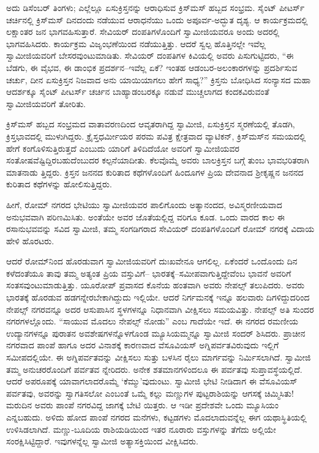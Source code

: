 ಅದು ಡಿಸೆಂಬರ್ ತಿಂಗಳು; ಎಲ್ಲೆಲ್ಲೂ ಏಸುಕ್ರಿಸ್ತನನ್ನು ಆರಾಧಿಸುವ ಕ್ರಿಸ್​ಮಸ್ ಹಬ್ಬದ ಸಂಭ್ರಮ. ಸೈಂಟ್ ಪೀಟರ್ಸ್ ಚರ್ಚಿನಲ್ಲಿ ಕ್ರಿಸ್​ಮಸ್ ದಿನದಂದು ನಡೆಯುವ ಆರಾಧನೆಯು ಒಂದು ಅಪೂರ್ವ-ಅದ್ಭುತ ದೃಶ್ಯ. ಆ ಕಾರ್ಯಕ್ರಮದಲ್ಲಿ ಲಕ್ಷಾಂತರ ಜನ ಭಾಗವಹಿಸುತ್ತಾರೆ. ಸೇವಿಯರ್ ದಂಪತಿಗಳೊಂದಿಗೆ ಸ್ವಾಮೀಜಿಯವರೂ ಅಂದು ಅದರಲ್ಲಿ ಭಾಗವಹಿಸಿದರು. ಕಾರ್ಯಕ್ರಮ ವಿಜೃಂಭಣೆಯಿಂದ ನಡೆಯುತ್ತಿತ್ತು. ಆದರೆ ಸ್ವಲ್ಪ ಹೊತ್ತಿನಲ್ಲೇ ಇವೆಲ್ಲ ಸ್ವಾಮೀಜಿಯವರಿಗೆ ಬೇಸರವುಂಟುಮಾಡಿತು. ಸೇವಿಯರ್ ದಂಪತಿಗಳ ಕಿವಿಯಲ್ಲಿ ಅವರು ಪಿಸುಗುಟ್ಟಿದರು, “ಈ ಬೆಡಗು, ಈ ವೈಭವ, ಈ ಡಾಂಭಿಕ ಪ್ರದರ್ಶನ–ಇವೆಲ್ಲ ಏಕೆ? ಇಂತಹ ಆಡಂಬರ-ಅಲಂಕಾರಗಳನ್ನು ಪ್ರದರ್ಶಿಸುವ ಚರ್ಚು, ದೀನ ಏಸುಕ್ರಿಸ್ತನ ನಿಜವಾದ ಅನು ಯಾಯಿಯಾಗಲು ಹೇಗೆ ಸಾಧ್ಯ?” ಕ್ರಿಸ್ತನು ಬೋಧಿಸಿದ ಸಂನ್ಯಾಸದ ಮಹಾ ಆದರ್ಶಕ್ಕೂ ಸೈಂಟ್ ಪೀಟರ್ಸ್ ಚರ್ಚಿನ ಬಾಹ್ಯಾಡಂಬರಕ್ಕೂ ನಡುವೆ ಮುಚ್ಚಲಾಗದ ಕಂದಕವಿರುವಂತೆ ಸ್ವಾಮೀಜಿಯವರಿಗೆ ತೋರಿತು.

ಕ್ರಿಸ್​ಮಸ್ ಹಬ್ಬದ ಸಂಭ್ರಮದ ವಾತಾವರಣದಿಂದ ಆವೃತರಾಗಿದ್ದ ಸ್ವಾಮೀಜಿ, ಏಸುಕ್ರಿಸ್ತನ ಸ್ಮರಣೆಯಲ್ಲಿ ತೊಡಗಿ, ಕ್ರಿಸ್ತಭಾವದಲ್ಲಿ ಮುಳುಗಿದ್ದರು. ಕ್ರೈಸ್ತಧರ್ಮೀಯರ ಪರಮ ಪವಿತ್ರ ಕ್ಷೇತ್ರವಾದ ವ್ಯಾಟಿಕನ್, ಕ್ರಿಸ್​ಮಸ್​ನ ಸಮಯದಲ್ಲಿ ಹೇಗೆ ಕಂಗೊಳಿಸುತ್ತಿರುತ್ತದೆ ಎಂಬುದು ಯಾರಿಗೆ ತಿಳಿದಿದೆಯೋ ಅವರಿಗೆ ಸ್ವಾಮೀಜಿಯವರ ಸಂತೋಷವೆಷ್ಟಿದ್ದಿರಬಹುದೆಂಬುದರ ಕಲ್ಪನೆಯಾದೀತು. ಕೆಲವೊಮ್ಮೆ ಅವರು ಬಾಲಕ್ರಿಸ್ತನ ಬಗ್ಗೆ ತುಂಬ ಭಾವಭರಿತರಾಗಿ ಮಾತನಾಡು ತ್ತಿದ್ದರು. ಕ್ರಿಸ್ತನ ಜನನದ ಕುರಿತಾದ ಕಥೆಗಳೊಂದಿಗೆ ಹಿಂದೂಗಳ ಪ್ರಿಯ ದೇವನಾದ ಶ್ರೀಕೃಷ್ಣನ ಜನನದ ಕುರಿತಾದ ಕಥೆಗಳನ್ನು ಹೋಲಿಸುತ್ತಿದ್ದರು.

ಹೀಗೆ, ರೋಮ್ ನಗರದ ಭೇಟಿಯು ಸ್ವಾಮೀಜಿಯವರ ಪಾಲಿಗೊಂದು ಅತ್ಯಾನಂದದ, ಅವಿಸ್ಮರಣೀಯವಾದ ಅನುಭವವಾಗಿ ಪರಿಣಮಿಸಿತು. ಅಂತೆಯೇ ಅವರ ಜೊತೆಯಲ್ಲಿದ್ದ ವರಿಗೂ ಕೂಡ. ಒಂದು ವಾರದ ಕಾಲ ಈ ರಸಾನುಭವವನ್ನು ಸವಿದ ಸ್ವಾಮೀಜಿ, ತಮ್ಮ ಸಂಗಡಿಗರಾದ ಸೇವಿಯರ್ ದಂಪತಿಗಳೊಂದಿಗೆ ರೋಮ್ ನಗರಕ್ಕೆ ವಿದಾಯ ಹೇಳಿ ಹೊರಟರು.

ಆದರೆ ರೋಮ್​ನಿಂದ ಹೊರಡುವಾಗ ಸ್ವಾಮೀಜಿಯವರಿಗೆ ದುಃಖವೇನೂ ಆಗಲಿಲ್ಲ. ಏಕೆಂದರೆ ಒಂದೊಂದು ದಿನ ಕಳೆದಂತೆಯೂ ತಾವು ತಮ್ಮ ಅತ್ಯಂತ ಪ್ರಿಯ ವಸ್ತುವಿಗೆ– ಭಾರತಕ್ಕೆ–ಸಮೀಪವಾಗುತ್ತಿದ್ದೇವೆಂಬ ಭಾವನೆ ಅವರಿಗೆ ಸಂತಸವುಂಟುಮಾಡುತ್ತಿತ್ತು. ಯೂರೋಪ್ ಪ್ರವಾಸದ ಕೊನೆಯ ಹಂತವಾಗಿ ಅವರು ನೇಪಲ್ಸ್ ತಲುಪಿದರು. ಅವರು ಭಾರತಕ್ಕೆ ಹೊರಡುವ ಹಡಗನ್ನೇರಬೇಕಾಗಿದ್ದುದು ಇಲ್ಲಿಯೇ. ಆದರೆ ನಿರ್ಗಮನಕ್ಕೆ ಇನ್ನೂ ಹಲವಾರು ದಿಗಳಿದ್ದುದರಿಂದ ನೇಪಲ್ಸ್ ನಗರವನ್ನೂ ಅದರ ಆಸುಪಾಸಿನ ಸ್ಥಳಗಳನ್ನೂ ನಿಧಾನವಾಗಿ ವೀಕ್ಷಿಸಲು ಸಮಯವಿತ್ತು. ನೇಪಲ್ಸ್ ಅತಿ ಸುಂದರ ನಗರಗಳಲ್ಲೊಂದು. “ಸಾಯುವ ಮೊದಲು ನೇಪಲ್ಸ್ ನೋಡು” ಎಂಬ ಗಾದೆಯೇ ಇದೆ. ಈ ನಗರದ ರಮಣೀಯ ಉದ್ಯಾನಗಳನ್ನೂ ಪುರಾತನ ಅವಶೇಷಗಳನ್ನೊಳಗೊಂಡ ಮ್ಯೂಸಿಯಮ್ಮನ್ನೂ ಸ್ವಾಮೀಜಿ ಸಂದರ್ ಶಿಸಿದರು. ಪ್ರಾಚೀನ ನಗರವಾದ ಪಾಂಪೆ ಹಾಗೂ ಅದರ ವಿನಾಶಕ್ಕೆ ಕಾರಣವಾದ ವೆಸೂವಿಯಸ್ ಅಗ್ನಿಪರ್ವತವಿರುವುದು ಇಲ್ಲಿಗೆ ಸಮೀಪದಲ್ಲಿಯೇ. ಈ ಅಗ್ನಿಪರ್ವತವನ್ನು ವೀಕ್ಷಿಸಲು ಸುತ್ತು ಬಳಸಿನ ರೈಲು ಮಾರ್ಗವನ್ನು ನಿರ್ಮಿಸಲಾಗಿದೆ. ಸ್ವಾಮೀಜಿ ತಮ್ಮ ಅನುಚರರೊಂದಿಗೆ ಪರ್ವತವ ನ್ನೇರಿದರು. ಅನೇಕ ಶತಮಾನಗಳಿಂದಲೂ ಈ ಪರ್ವತವು ಸುಪ್ತಾವಸ್ಥೆಯಲ್ಲಿದೆ. ಆದರೆ ಅಪರೂಪಕ್ಕೆ ಯಾವಾಗಲಾದರೊಮ್ಮೆ ‘ಕೆಮ್ಮು’ವುದುಂಟು. ಸ್ವಾಮೀಜಿ ಭೇಟಿ ನೀಡಿದಾಗ ಈ ವೆಸೂವಿಯಸ್ ಪರ್ವತವು, ಅವರನ್ನು ಸ್ವಾಗತಿಸಲೋ ಎಂಬಂತೆ ಒಮ್ಮೆ ಕಲ್ಲು ಮಣ್ಣುಗಳ ಪುಟ್ಟರಾಶಿಯನ್ನು ಆಗಸಕ್ಕೆ ಚಿಮ್ಮಿಸಿತು! ಮರುದಿನ ಅವರು ಪಾಂಪೆ ನಗರವಿದ್ದ ಜಾಗಕ್ಕೆ ಬೇಟಿ ಯಿತ್ತರು. ಆ ಇಡೀ ಪ್ರದೇಶವೇ ಒಂದು ಮ್ಯೂಸಿಯಂ ಎನ್ನಬಹುದು. ಅಳಿದು ಹೋದ ಪಾಂಪೆ ನಗರದ ಮನೆಗಳು, ಕಟ್ಟಡಗಳು ಮೊದಲಾದುವನ್ನೆಲ್ಲ ಈಗ ಯಥಾಸ್ಥಿತಿಯಲ್ಲಿ ಉಳಿಸಿಡಲಾಗಿದೆ. ಮಣ್ಣು-ಬೂದಿಯ ರಾಶಿಯಡಿಯಿಂದ ಇತರ ನೂರಾರು ವಸ್ತುಗಳನ್ನು ತೆಗೆದು ಅಲ್ಲಿಯೇ ಸಂರಕ್ಷಿಸಿಟ್ಟಿದ್ದಾರೆ. ಇವುಗಳನ್ನೆಲ್ಲ ಸ್ವಾಮೀಜಿ ಅತ್ಯಾಸಕ್ತಿಯಿಂದ ವೀಕ್ಷಿಸಿದರು. 

